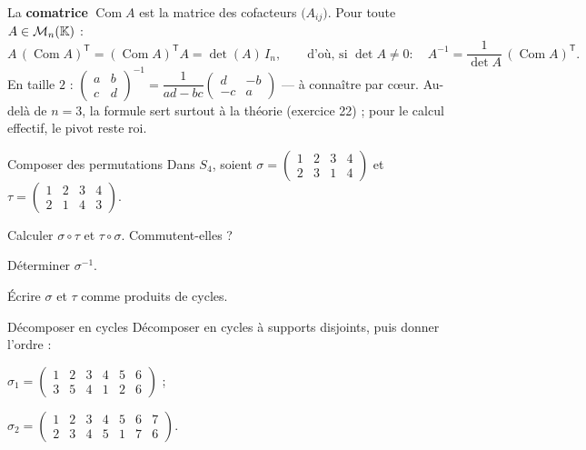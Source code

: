 
\begin{theoreme}
La \textbf{comatrice} $\operatorname{Com}A$ est la matrice des cofacteurs
$\bigl(A_{ij}\bigr)$. Pour toute $A\in\mathcal{M}_n(\mathbb{K})$ :
\[
A\,(\operatorname{Com}A)^{\mathsf T}
=(\operatorname{Com}A)^{\mathsf T}A=\det(A)\,I_n ,
\qquad\text{d'où, si }\det A\neq0 :\quad
A^{-1}=\frac{1}{\det A}\,(\operatorname{Com}A)^{\mathsf T}.
\]
En taille $2$ : $\begin{pmatrix}a&b\\c&d\end{pmatrix}^{-1}
=\dfrac{1}{ad-bc}\begin{pmatrix}d&-b\\-c&a\end{pmatrix}$ — à connaître par
cœur. Au-delà de $n=3$, la formule sert surtout à la théorie (exercice 22) ;
pour le calcul effectif, le pivot reste roi.
\end{theoreme}

\exercices
{}

\begin{exercice}[1]{Composer des permutations}
Dans $S_4$, soient
$\sigma=\begin{pmatrix}1&2&3&4\\2&3&1&4\end{pmatrix}$ et
$\tau=\begin{pmatrix}1&2&3&4\\2&1&4&3\end{pmatrix}$.
\begin{questions}
  \item Calculer $\sigma\circ\tau$ et $\tau\circ\sigma$. Commutent-elles ?
  \item Déterminer $\sigma^{-1}$.
  \item Écrire $\sigma$ et $\tau$ comme produits de cycles.
\end{questions}
\end{exercice}

\begin{exercice}[1]{Décomposer en cycles}
Décomposer en cycles à supports disjoints, puis donner l'ordre :
\begin{questions}
  \item $\sigma_1=\begin{pmatrix}1&2&3&4&5&6\\3&5&4&1&2&6\end{pmatrix}$ ;
  \item $\sigma_2=\begin{pmatrix}1&2&3&4&5&6&7\\2&3&4&5&1&7&6\end{pmatrix}$.
\end{questions}
\end{exercice}

